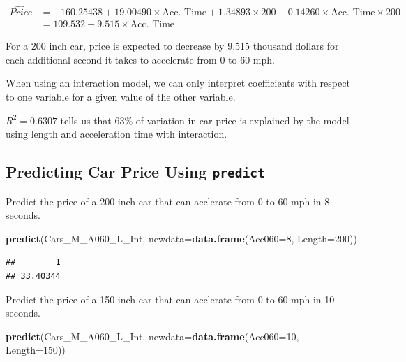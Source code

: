 \documentclass[]{book}
\newenvironment{Shaded}{\begin{snugshade}}{\end{snugshade}}
\newcommand{\KeywordTok}[1]{\textcolor[rgb]{0.13,0.29,0.53}{\textbf{#1}}}
\newcommand{\DataTypeTok}[1]{\textcolor[rgb]{0.13,0.29,0.53}{#1}}
\newcommand{\DecValTok}[1]{\textcolor[rgb]{0.00,0.00,0.81}{#1}}
\newcommand{\NormalTok}[1]{#1}
\begin{document}
\[
\begin{aligned}
\widehat{Price} & = -160.25438 + 19.00490\times\text{Acc. Time} + 1.34893\times200 - 0.14260\times\text{Acc. Time}\times200 \\
 &= 109.532 -9.515\times\text{Acc. Time} 
\end{aligned}
\]

For a 200 inch car, price is expected to decrease by 9.515 thousand
dollars for each additional second it takes to accelerate from 0 to 60
mph.

When using an interaction model, we can only interpret coefficients with
respect to one variable for a given value of the other variable.

\(R^2=0.6307\) tells us that 63\% of variation in car price is explained
by the model using length and acceleration time with interaction.

\subsection{\texorpdfstring{Predicting Car Price Using
\texttt{predict}}{Predicting Car Price Using predict}}\label{predicting-car-price-using-predict}

Predict the price of a 200 inch car that can acclerate from 0 to 60 mph
in 8 seconds.

\begin{Shaded}
\begin{Highlighting}[]
\KeywordTok{predict}\NormalTok{(Cars_M_A060_L_Int, }\DataTypeTok{newdata=}\KeywordTok{data.frame}\NormalTok{(}\DataTypeTok{Acc060=}\DecValTok{8}\NormalTok{, }\DataTypeTok{Length=}\DecValTok{200}\NormalTok{))}
\end{Highlighting}
\end{Shaded}

\begin{verbatim}
##        1 
## 33.40344
\end{verbatim}

Predict the price of a 150 inch car that can acclerate from 0 to 60 mph
in 10 seconds.

\begin{Shaded}
\begin{Highlighting}[]
\KeywordTok{predict}\NormalTok{(Cars_M_A060_L_Int, }\DataTypeTok{newdata=}\KeywordTok{data.frame}\NormalTok{(}\DataTypeTok{Acc060=}\DecValTok{10}\NormalTok{, }\DataTypeTok{Length=}\DecValTok{150}\NormalTok{))}
\end{Highlighting}
\end{Shaded}
\end{document}
